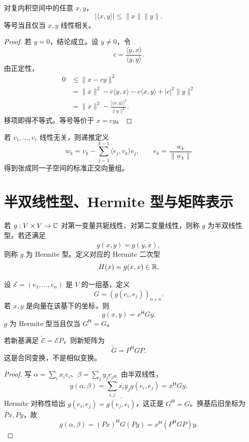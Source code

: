 \begin{theorem}
对复内积空间中的任意 $x,y$，
\[
|\langle x,y\rangle|
\le\lVert x\rVert\lVert y\rVert.
\]
等号当且仅当 $x,y$ 线性相关。
\end{theorem}
\begin{proof}
若 $y=0$，结论成立。设 $y\ne0$，令
\[
c=\frac{\langle y,x\rangle}{\langle y,y\rangle}.
\]
由正定性，
\begin{align*}
0&\le\lVert x-cy\rVert^2\\
&=\lVert x\rVert^2-\overline c\langle y,x\rangle
-c\langle x,y\rangle+|c|^2\lVert y\rVert^2\\
&=\lVert x\rVert^2-
\frac{|\langle x,y\rangle|^2}{\lVert y\rVert^2}.
\end{align*}
移项即得不等式。等号等价于 $x=cy$。
\end{proof}

\begin{proposition}
若 $v_1,\ldots,v_r$ 线性无关，则递推定义
\[
w_k=v_k-\sum_{j=1}^{k-1}\langle e_j,v_k\rangle e_j,
\qquad
e_k=\frac{w_k}{\lVert w_k\rVert}
\]
得到张成同一子空间的标准正交向量组。
\end{proposition}

\section{半双线性型、Hermite 型与矩阵表示}

\begin{definition}
若 $g:V\times V\to\mathbb{C}$ 对第一变量共轭线性、对第二变量线性，则称 $g$ 为半双线性型。若还满足
\[
g(x,y)=\overline{g(y,x)},
\]
则称 $g$ 为 Hermite 型。定义对应的 Hermite 二次型
\[
H(x)=g(x,x)\in\mathbb{R}.
\]
\end{definition}

\begin{theorem}
设 $\mathcal E=(e_1,\ldots,e_n)$ 是 $V$ 的一组基，定义
\[
G=(g(e_i,e_j))_{n\times n}.
\]
若 $x,y$ 是向量在该基下的坐标，则
\[
g(x,y)=x^{\mathsf H}Gy.
\]
$g$ 为 Hermite 型当且仅当 $G^{\mathsf H}=G$。

若新基满足 $\widetilde{\mathcal E}=\mathcal EP$，则新矩阵为
\[
\widetilde G=P^{\mathsf H}GP.
\]
这是合同变换，不是相似变换。
\end{theorem}
\begin{proof}
写 $\alpha=\sum_i x_ie_i$、$\beta=\sum_jy_je_j$。由半双线性，
\[
g(\alpha,\beta)
=\sum_{i,j}\overline{x_i}y_jg(e_i,e_j)
=x^{\mathsf H}Gy.
\]
Hermite 对称性给出 $g(e_i,e_j)=\overline{g(e_j,e_i)}$，这正是
$G^{\mathsf H}=G$。换基后旧坐标为 $Px,Py$，故
\[
g(\alpha,\beta)=(Px)^{\mathsf H}G(Py)
=x^{\mathsf H}(P^{\mathsf H}GP)y.
\]
\end{proof}

